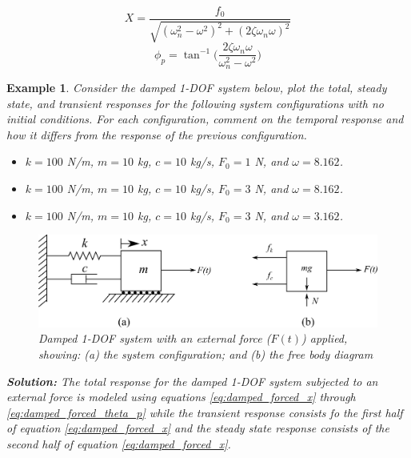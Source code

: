 \documentclass[12pt,letter]{article}
\newtheorem{ex}{Example}
\numberwithin{ex}{section} %
\newenvironment{example}{\begin{mdframed}[middlelinewidth=0.5mm]\begin{ex}\normalfont}{\end{ex}\end{mdframed}}
\numberwithin{re}{section} %
\numberwithin{vcs}{section} %
\begin{document}
			\begin{equation}
				X = \frac{f_0}{\sqrt{(\omega_n^2 - \omega^2)^2 +  (2\zeta \omega_n \omega)^2}} 
			\end{equation}	
			\begin{equation}
				\phi_p = \tan^{-1} \bigg(\frac{2\zeta \omega_n \omega}{\omega_n^2 - \omega^2}\bigg)
				\label{eq:damped_forced_theta_p}
			\end{equation}		
			\begin{example}
			\label{ex:homogeneous_and_particular_solutions_in_resonance}		
				Consider the damped 1-DOF system below, plot the total, steady state, and transient responses for the following system configurations with no initial conditions. For each configuration, comment on the temporal response and how it differs from the response of the previous configuration.    
				
				\begin{itemize}
				\item[a)] $k=100$ N/m, $m=10$ kg,  $c=10$ kg/s, $F_0=1$ N, and $\omega = 8.162$.
				\item[b)] $k=100$ N/m, $m=10$ kg,  $c=10$ kg/s, $F_0=3$ N, and $\omega = 8.162$.
				\item[c)] $k=100$ N/m, $m=10$ kg,  $c=10$ kg/s, $F_0=3$ N, and $\omega = 3.162$.
				\end{itemize}
				
				\begin{figure}[H]
					\centering
					\includegraphics[]{../figures/1-DOF-spring_dashpot_mass_horizontal_forced_FBD.png}
					\caption{Damped 1-DOF system with an external force ($F(t)$) applied, showing: (a) the system configuration; and (b) the free body diagram}
				\end{figure}
				
				\noindent\textbf{Solution:} The total response for the damped 1-DOF system subjected to an external force is modeled using equations \ref{eq:damped_forced_x} through \ref{eq:damped_forced_theta_p} while the transient response consists fo the first half of equation \ref{eq:damped_forced_x} and the steady state response consists of the second half of equation \ref{eq:damped_forced_x}.  
				

\end{example}
\end{document}
